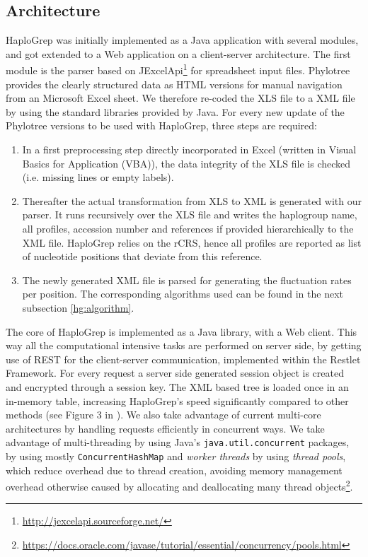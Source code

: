 \subsection{Architecture}
HaploGrep was initially implemented as a Java application with several modules, and got extended to a Web application on a client-server architecture. The first module is the parser based on JExcelApi\footnote{\url{http://jexcelapi.sourceforge.net/}} for spreadsheet input files. Phylotree provides the clearly structured data as HTML versions for manual navigation from an Microsoft Excel sheet. We therefore re-coded the XLS file to a XML file by using the standard libraries provided by Java. For every new update of the Phylotree versions to be used with HaploGrep, three steps are required: 
\begin{enumerate}
\item In a first preprocessing step directly incorporated in Excel (written in Visual Basics for Application (VBA)), the data integrity of the XLS file is checked (i.e. missing lines or empty labels). 
\item Thereafter the actual transformation from XLS to XML is generated with our parser. It runs recursively over the XLS file and writes the haplogroup name, all profiles, accession number and references if provided hierarchically to the XML file. HaploGrep relies on the rCRS, hence all profiles are reported as list of nucleotide positions that deviate from this reference. 
\item The newly generated XML file is parsed for generating the fluctuation rates per position. The corresponding algorithms used can be found in the next subsection \ref{hg:algorithm}.
\end{enumerate}
The core of HaploGrep is implemented as a Java library, with a Web client. This way all the computational intensive tasks are performed on server side, by getting use of REST for the client-server communication, implemented within the Restlet Framework. For every request a server side generated session object is created and encrypted through a session key. The XML based tree is loaded once in an in-memory table, increasing HaploGrep's speed significantly compared to other methods (see Figure 3 in \cite{Kloss-Brandstatter2011}). We also take advantage of current multi-core architectures by handling requests efficiently in concurrent ways. We take advantage of multi-threading by using Java's \verb|java.util.concurrent| packages, by using mostly \verb|ConcurrentHashMap| and \textit{worker threads} by using \textit{thread pools}, which reduce overhead due to thread creation, avoiding memory management overhead otherwise caused by allocating and deallocating many thread objects\footnote{\url{https://docs.oracle.com/javase/tutorial/essential/concurrency/pools.html}}. \\
